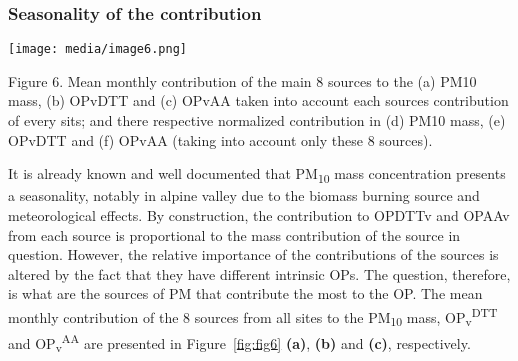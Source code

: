 \documentclass[
]{article}
\begin{document}
\hypertarget{seasonality-of-the-contribution}{%
\subsubsection{Seasonality of the
contribution}\label{seasonality-of-the-contribution}}

\texttt{[image: media/image6.png]}

Figure 6. Mean monthly contribution of the main 8 sources to the (a)
PM10 mass, (b) OPvDTT and (c) OPvAA taken into account each sources
contribution of every sits; and there respective normalized contribution
in (d) PM10 mass, (e) OPvDTT and (f) OPvAA (taking into account only
these 8 sources).

It is already known and well documented that PM\textsubscript{10} mass
concentration presents a seasonality, notably in alpine valley due to
the biomass burning source and meteorological effects. By construction,
the contribution to OPDTTv and OPAAv from each source is proportional to
the mass contribution of the source in question. However, the relative
importance of the contributions of the sources is altered by the fact
that they have different intrinsic OPs. The question, therefore, is what
are the sources of PM that contribute the most to the OP. The mean
monthly contribution of the 8 sources from all sites to the
PM\textsubscript{10} mass, OP\textsubscript{v}\textsuperscript{DTT} and
OP\textsubscript{v}\textsuperscript{AA} are presented in
Figure~\protect\hyperlink{fig:fig6}{{[}fig:fig6{]}} \textbf{(a)},
\textbf{(b)} and \textbf{(c)}, respectively.
\end{document}
